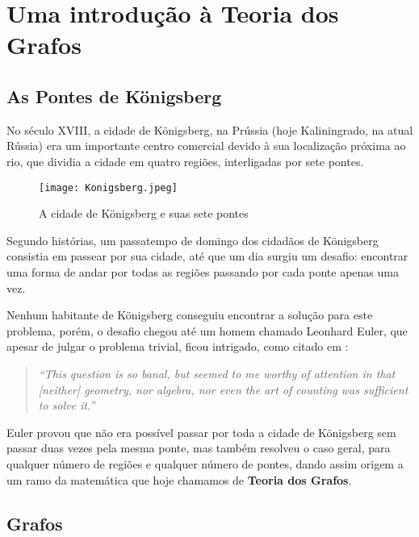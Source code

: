 
\chapter{Uma introdução à Teoria dos Grafos}
\label{cap:introducao}

\section{As Pontes de Königsberg}

No século XVIII, a cidade de Königsberg, na Prússia (hoje Kaliningrado, na  atual 
Rússia) era um importante centro comercial devido à sua localização próxima ao rio,
que dividia a cidade em quatro regiões, interligadas por sete pontes.

\begin{figure}
  \texttt{[image: Konigsberg.jpeg]}
  \caption{A cidade de Königsberg e suas sete pontes}
\end{figure}

Segundo histórias, um passatempo de domingo dos cidadãos de Königsberg consistia em
passear por sua cidade, até que um dia surgiu um desafio: encontrar uma forma
de andar por todas as regiões passando por cada ponte apenas uma vez.

Nenhum habitante de Königsberg conseguiu encontrar a solução para este problema,
porém, o desafio chegou até um homem chamado Leonhard Euler, que apesar de julgar
o problema trivial, ficou intrigado, como citado em \citet{hopkins04:the}:

\begin{quotation}
  \emph{``This question is so banal, but seemed to me worthy of attention in that 
  [neither] geometry, nor algebra, nor even the art of counting was sufficient to
  solve it.''}
\end{quotation}

Euler provou que não era possível passar por toda a cidade de Königsberg sem passar
duas vezes pela mesma ponte, mas também resolveu o caso geral,
para qualquer número de regiões e qualquer número de pontes, dando assim origem
a um ramo da matemática que hoje chamamos de \textbf{Teoria dos Grafos}.

\section{Grafos}

